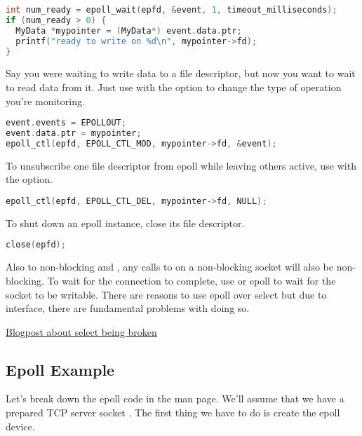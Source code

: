 \begin{lstlisting}[language=C]
int num_ready = epoll_wait(epfd, &event, 1, timeout_milliseconds);
if (num_ready > 0) {
  MyData *mypointer = (MyData*) event.data.ptr;
  printf("ready to write on %d\n", mypointer->fd);
}
\end{lstlisting}

Say you were waiting to write data to a file descriptor, but now you want to wait to read data from it.
Just use  with the  option to change the type of operation you're monitoring.

\begin{lstlisting}[language=C]
event.events = EPOLLOUT;
event.data.ptr = mypointer;
epoll_ctl(epfd, EPOLL_CTL_MOD, mypointer->fd, &event);
\end{lstlisting}

To unsubscribe one file descriptor from epoll while leaving others active, use  with the  option.

\begin{lstlisting}[language=C]
epoll_ctl(epfd, EPOLL_CTL_DEL, mypointer->fd, NULL);
\end{lstlisting}

To shut down an epoll instance, close its file descriptor.

\begin{lstlisting}[language=C]
close(epfd);
\end{lstlisting}

Also to non-blocking  and , any calls to  on a non-blocking socket will also be non-blocking.
To wait for the connection to complete, use  or epoll to wait for the socket to be writable.
There are reasons to use epoll over select but due to interface, there are fundamental problems with doing so.

\href{https://idea.popcount.org/2017-01-06-select-is-fundamentally-broken/}{Blogpost about select being broken}

\subsection{Epoll Example}

Let's break down the epoll code in the man page.
We'll assume that we have a prepared TCP server socket .
The first thing we have to do is create the epoll device.

